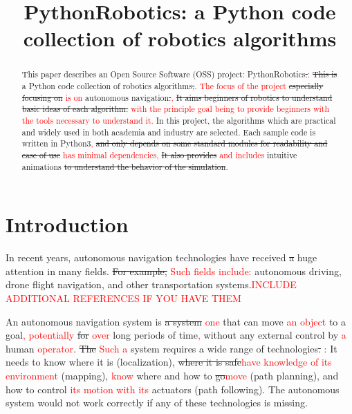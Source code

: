 \documentclass{bmvc2k}
\title{PythonRobotics: a Python code collection of robotics algorithms}
\def\jwd{\textcolor{red}}
\begin{document}
\maketitle

\begin{abstract}
This paper describes an Open Source Software (OSS) project: PythonRobotics\cite{github}\st{.}\jwd{:}
\st{This is} a Python code collection of robotics algorithms\st{,}\jwd{.}  \jwd{The focus of the project} 
\st{especially focusing on} \jwd{is on} autonomous navigation\st{.}\jwd{,}
\st{It aims beginners of robotics to understand basic ideas of each algorithm.} \jwd{with the principle goal being to provide beginners with the tools necessary to understand it.}
In this project, the algorithms which are practical and widely used in both academia and industry are selected.
Each sample code is written in Python3\jwd{,} \st{and only depends on some standard modules for readability and ease of use} \jwd{has minimal dependencies,}  \st{It also provides} \jwd{and includes} intuitive animations \st{to understand the behavior of the simulation}.

\end{abstract}

\section{Introduction}

In recent years, autonomous navigation technologies have received \st{a} huge attention in many fields. 
\st{For example,} \jwd{Such fields include:} autonomous driving\cite{pathplanning}, drone flight navigation, and other transportation systems.\jwd{INCLUDE ADDITIONAL REFERENCES IF YOU HAVE THEM}

An autonomous navigation system is \st{a system} \jwd{one} that can move \jwd{an object} to a goal\jwd{, potentially} \st{for} \jwd{over} long periods of time\jwd{,} without any external control by \jwd{a} human \jwd{operator}.
\st{The} \jwd{Such a} system requires a wide range of technologies\st{.} \jwd{:}
It needs to know where it is (localization), \st{where it is safe}\jwd{have knowledge of its environment} (mapping), \jwd{know} where and how to \st{go}\jwd{move} (path planning), and how to control \jwd{its motion with its} actuators (path following). 
The autonomous system would not work correctly if any of these technologies is missing.
\end{document}
